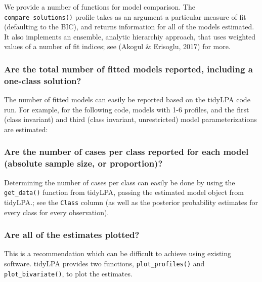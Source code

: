 \documentclass[man]{apa6}
\begin{document}
We provide a number of functions for model comparison. The \texttt{compare\_solutions()} profile
takes as an argument a particular measure of fit (defaulting to the BIC), and returns information
for all of the models estimated. It also implements an ensemble, analytic hierarchiy approach, that uses weighted values of a number of fit indices; see (Akogul \& Erisoglu, 2017) for more.

\hypertarget{are-the-total-number-of-fitted-models-reported-including-a-one-class-solution}{%
\subsubsection{Are the total number of fitted models reported, including a one-class solution?}\label{are-the-total-number-of-fitted-models-reported-including-a-one-class-solution}}

The number of fitted models can easily be reported based on the tidyLPA code run. For example, for the following code, models with 1-6 profiles, and the first (class invariant) and third (class invariant, unrestricted) model parameterizations are estimated:

\hypertarget{are-the-number-of-cases-per-class-reported-for-each-model-absolute-sample-size-or-proportion}{%
\subsubsection{Are the number of cases per class reported for each model (absolute sample size, or proportion)?}\label{are-the-number-of-cases-per-class-reported-for-each-model-absolute-sample-size-or-proportion}}

Determining the number of cases per class can easily be done by using the \texttt{get\_data()} function from tidyLPA, passing the estimated model object from tidyLPA.; see the \texttt{Class} column (as well as the posterior probability estimates for every class for every observation).

\hypertarget{are-all-of-the-estimates-plotted}{%
\subsubsection{Are all of the estimates plotted?}\label{are-all-of-the-estimates-plotted}}

This is a recommendation which can be difficult to achieve using existing software. tidyLPA provides two functions, \texttt{plot\_profiles()} and \texttt{plot\_bivariate()}, to plot the estimates.
\end{document}
